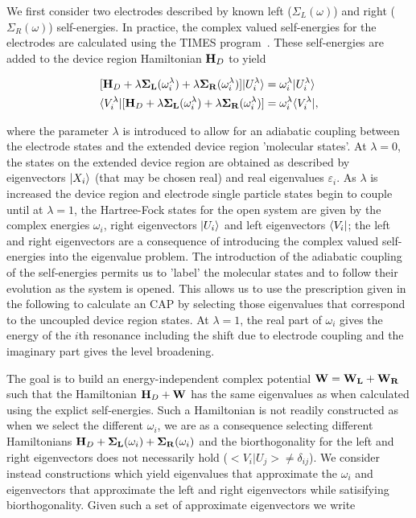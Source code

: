 We first consider two electrodes described by known left ($\Sigma_L(\omega)$)
and right ($\Sigma_R(\omega)$) self-energies. In practice, the complex valued
self-energies for the electrodes are calculated using the TIMES
program~\cite{times}. These self-energies are added to the device region
Hamiltonian $\mathbf{H}_D$ to yield
 
\begin{subequations}
\begin{align}
        [\mathbf{H}_D + \lambda \mathbf{\Sigma_L}(\omega_i^\lambda)
            +\lambda \mathbf{\Sigma_R}(\omega_i^\lambda)] |U_i^\lambda \rangle
        &= \omega_i^\lambda |U_i^\lambda \rangle \\
        \langle V_i^\lambda| [\mathbf{H}_D + \lambda \mathbf{\Sigma_L}(\omega_i^\lambda)
            +\lambda \mathbf{\Sigma_R}(\omega_i^\lambda)]
        &= \omega_i^\lambda \langle V_i^\lambda|,
        \label{eq:adiabaticap}
\end{align}
\end{subequations}

where the parameter $\lambda$ is introduced to allow for an adiabatic
coupling between the electrode states and the extended device region
'molecular states'.  At $\lambda = 0$, the states on the extended device
region are obtained as described by eigenvectors $|X_i \rangle$ (that may
be chosen real) and real eigenvalues $\varepsilon_i$. As $\lambda$ is
increased the device region and electrode single particle states begin
to couple until at $\lambda=1$, the Hartree-Fock states for the open
system are given by the complex energies $\omega_i$, right eigenvectors
$|U_i \rangle$ and left eigenvectors $\langle V_i|$; the left and right
eigenvectors are a consequence of introducing the complex valued
self-energies into the eigenvalue problem. The introduction of the
adiabatic coupling of the self-energies permits us to 'label' the
molecular states and to follow their evolution as the system is opened.
This allows us to use the prescription given in the following to
calculate an \ai \ac{CAP} by selecting those eigenvalues that correspond
to the uncoupled device region states. At $\lambda=1$, the real part of
$\omega_i$ gives the energy of the $i$th resonance including the shift due
to electrode coupling and the imaginary part gives the level broadening.

The goal is to build an energy-independent complex potential
$\mathbf{W} = \mathbf{W_L} + \mathbf{W_R}$
such that the Hamiltonian $\mathbf{H}_D + \mathbf{W}$ has the same eigenvalues
as when calculated using the explict self-energies. Such a Hamiltonian is
not readily constructed as when we select the different $\omega_i$, we are
as a consequence selecting different Hamiltonians
$\mathbf{H}_D + \mathbf{\Sigma_L}(\omega_i) + \mathbf{\Sigma_R}(\omega_i)$
and the biorthogonality for the left and right eigenvectors does not
necessarily hold ($<V_i|U_j> \ne \delta_{ij}$). We consider instead
constructions which yield eigenvalues that approximate the $\omega_i$  and
eigenvectors that approximate the left and right eigenvectors while
satisifying biorthogonality. Given such a set of approximate eigenvectors
we write

